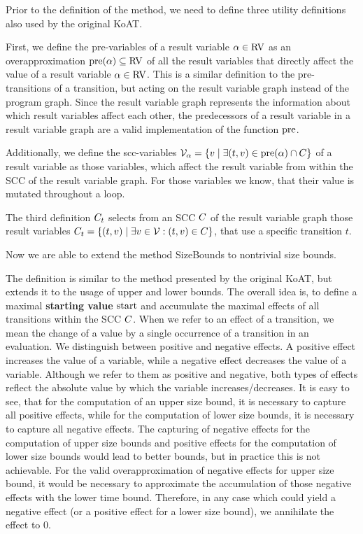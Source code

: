 Prior to the definition of the method, we need to define three utility definitions also used by the original KoAT.

First, we define the pre-variables of a result variable $\alpha \in \text{RV}$ as an overapproximation $\text{pre}(\alpha) \subseteq \text{RV}$ of all the result variables that directly affect the value of a result variable $\alpha \in \text{RV}$.
This is a similar definition to the pre-transitions of a transition, but acting on the result variable graph instead of the program graph.
Since the result variable graph represents the information about which result variables affect each other, the predecessors of a result variable in a result variable graph are a valid implementation of the function $\text{pre}$.

Additionally, we define the scc-variables $\mathcal{V}_\alpha = \lbrace  v \mid \exists (t, v) \in \text{pre}(\alpha) \cap C  \rbrace$ of a result variable as those variables, which affect the result variable from within the SCC of the result variable graph.
For those variables we know, that their value is mutated throughout a loop.

The third definition $C_t$ selects from an SCC $C$ of the result variable graph those result variables $C_t = \lbrace (t,v) \mid \exists v \in \mathcal{V} : (t,v) \in C \rbrace$, that use a specific transition $t$.


Now we are able to extend the method SizeBounds to nontrivial size bounds.



The definition is similar to the method presented by the original KoAT, but extends it to the usage of upper and lower bounds.
The overall idea is, to define a maximal \textbf{starting value} $\text{start}$ and accumulate the maximal effects of all transitions within the SCC $C$.
When we refer to an effect of a transition, we mean the change of a value by a single occurrence of a transition in an evaluation.
We distinguish between positive and negative effects.
A positive effect increases the value of a variable, while a negative effect decreases the value of a variable.
Although we refer to them as positive and negative, both types of effects reflect the absolute value by which the variable increases/decreases.
It is easy to see, that for the computation of an upper size bound, it is necessary to capture all positive effects, while for the computation of lower size bounds, it is necessary to capture all negative effects.
The capturing of negative effects for the computation of upper size bounds and positive effects for the computation of lower size bounds would lead to better bounds, but in practice this is not achievable.
For the valid overapproximation of negative effects for upper size bound, it would be necessary to approximate the accumulation of those negative effects with the lower time bound.
Therefore, in any case which could yield a negative effect (or a positive effect for a lower size bound), we annihilate the effect to $0$.

